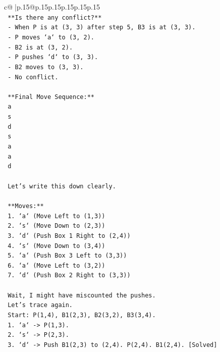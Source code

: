 \documentclass{article}
\begin{document}
{\begin{supertabular}{c@{$\;$}|p{.15\linewidth}@{}p{.15\linewidth}p{.15\linewidth}p{.15\linewidth}p{.15\linewidth}p{.15\linewidth}}
{{{\\ 
\texttt{    **Is there any conflict?**} \\
\texttt{    {-} When P is at (3, 3) after step 5, B3 is at (3, 3).} \\
\texttt{    {-} P moves `a` to (3, 2).} \\
\texttt{    {-} B2 is at (3, 2).} \\
\texttt{    {-} P pushes `d` to (3, 3).} \\
\texttt{    {-} B2 moves to (3, 3).} \\
\texttt{    {-} No conflict.} \\
\\ 
\texttt{    **Final Move Sequence:**} \\
\texttt{    a} \\
\texttt{    s} \\
\texttt{    d} \\
\texttt{    s} \\
\texttt{    a} \\
\texttt{    a} \\
\texttt{    d} \\
\\ 
\texttt{    Let's write this down clearly.} \\
\\ 
\texttt{    **Moves:**} \\
\texttt{    1. `a` (Move Left to (1,3))} \\
\texttt{    2. `s` (Move Down to (2,3))} \\
\texttt{    3. `d` (Push Box 1 Right to (2,4))} \\
\texttt{    4. `s` (Move Down to (3,4))} \\
\texttt{    5. `a` (Push Box 3 Left to (3,3))} \\
\texttt{    6. `a` (Move Left to (3,2))} \\
\texttt{    7. `d` (Push Box 2 Right to (3,3))} \\
\\ 
\texttt{    Wait, I might have miscounted the pushes.} \\
\texttt{    Let's trace again.} \\
\texttt{    Start: P(1,4), B1(2,3), B2(3,2), B3(3,4).} \\
\texttt{    1. `a` {-}> P(1,3).} \\
\texttt{    2. `s` {-}> P(2,3).} \\
\texttt{    3. `d` {-}> Push B1(2,3) to (2,4). P(2,4). B1(2,4). {[}Solved{]}} \\
}}}
\end{supertabular}}
\end{document}
